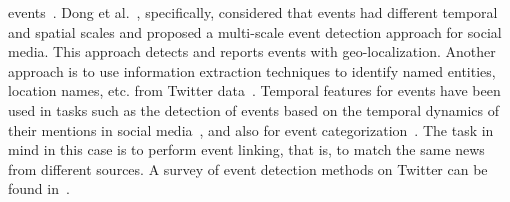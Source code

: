 events~\cite{Sakaki:Tweet:2013,DeLongueville:2009}.
%
Dong et al.~\cite{Dong2015}, specifically, considered that events had different
temporal and spatial scales and proposed a multi-scale event detection approach
for social media.
%
This approach detects and reports events with geo-localization.
%
Another approach is to use information extraction techniques to identify named
entities, location names, etc. from Twitter
data~\cite{Ritter:2012:ODE:2339530.2339704}.
%
Temporal features for events have been used in tasks such as the detection of
events based on the temporal dynamics of their mentions in social
media~\cite{guille2015event}, and also for event
categorization~\cite{Ritter:2012:ODE:2339530.2339704}. 
%
The task in mind in this case is to perform event linking, that is, to match the
same news from different sources.
%
A survey of event detection methods on Twitter can be found
in~\cite{hasan2018survey}.



